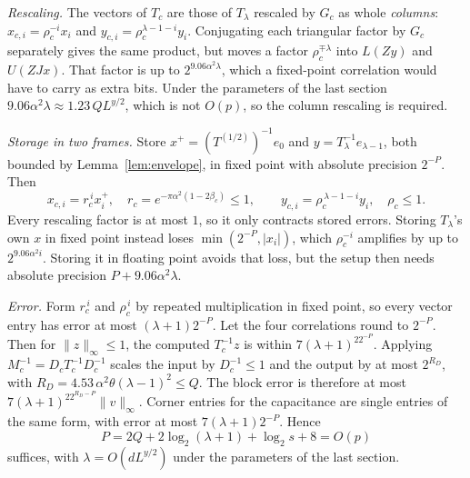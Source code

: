 \documentclass[11pt]{article}
\theoremstyle{remark}\newtheorem*{remark}{Remark}
\begin{document}
\emph{Rescaling.} The vectors of $T_c$ are those of $T_\lambda$ rescaled by $G_c$ as whole
\emph{columns}: $x_{c,i}=\rho_c^{-i}x_i$ and $y_{c,i}=\rho_c^{\lambda-1-i}y_i$. Conjugating each
triangular factor by $G_c$ separately gives the same product, but moves a factor $\rho_c^{\mp\lambda}$
into $L(Zy)$ and $U(ZJx)$. That factor is up to $2^{9.06\alpha^2\lambda}$, which a fixed-point
correlation would have to carry as extra bits. Under the parameters of the last section
$9.06\alpha^2\lambda\approx1.23\,QL^{y/2}$, which is not $O(p)$, so the column rescaling is required.

\emph{Storage in two frames.} Store $x^+=(T^{(1/2)})^{-1}e_0$ and $y=T_\lambda^{-1}e_{\lambda-1}$,
both bounded by Lemma~\ref{lem:envelope}, in fixed point with absolute precision $2^{-P}$. Then
\[
 x_{c,i}=r_c^{\,i}x^+_i,\quad r_c=e^{-\pi\alpha^2(1-2\beta_c)}\le1,\qquad
 y_{c,i}=\rho_c^{\,\lambda-1-i}y_i,\quad\rho_c\le1 .
\]
Every rescaling factor is at most $1$, so it only contracts stored errors. Storing $T_\lambda$'s
own $x$ in fixed point instead loses $\min(2^{-P},|x_i|)$, which $\rho_c^{-i}$ amplifies by up to
$2^{9.06\alpha^2 i}$. Storing it in floating point avoids that loss, but the setup then needs absolute
precision $P+9.06\alpha^2\lambda$.

\emph{Error.} Form $r_c^{\,i}$ and $\rho_c^{\,i}$ by repeated multiplication in fixed point, so
every vector entry has error at most $(\lambda+1)2^{-P}$. Let the four correlations round to
$2^{-P}$. Then for $\|z\|_\infty\le1$, the computed $T_c^{-1}z$ is within
$7(\lambda+1)^22^{-P}$. Applying $M_c^{-1}=D_cT_c^{-1}D_c^{-1}$ scales the input by
$D_c^{-1}\le1$ and the output by at most $2^{R_D}$, with $R_D=4.53\,\alpha^2\theta(\lambda-1)^2\le Q$.
The block error is therefore at most $7(\lambda+1)^22^{R_D-P}\|v\|_\infty$. Corner entries for
the capacitance are single entries of the same form, with error at most $7(\lambda+1)2^{-P}$.
Hence
\[
 P=2Q+2\log_2(\lambda+1)+\log_2s+8=O(p)
\]
suffices, with $\lambda=O(dL^{y/2})$ under the parameters of the last section.
\end{document}
